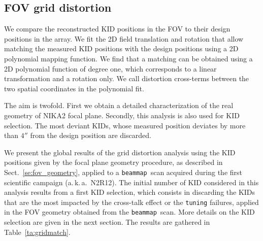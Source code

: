 \documentclass[traditionalabstract]{aa}
\newcommand{\aka}{a.\,k.\,a.}
\newcommand{\bm}{{\tt beammap}}
\newcommand{\lp}[1]{#1}
\begin{document}
\subsection{FOV grid distortion}
\label{se:grid_distortion}

We compare the reconstructed KID positions in the FOV to their design
positions in the array. We fit the 2D field translation and rotation that allow
matching the measured KID positions with the design positions using a 2D
polynomial mapping function. {\lp We find that a matching can be
obtained using a 2D polynomial function of degree one, which corresponds to a linear
transformation and a rotation only.} We call distortion cross-terms
between the two spatial coordinates in the polynomial fit.

The aim is twofold. First we obtain a detailed
characterization of the real geometry of NIKA2 focal plane. Secondly,
{\lp this analysis is also used for KID
selection}. The most deviant KIDs, whose measured position deviates
by more than $4''$ from the design position are discarded. 

We present the global results of the grid distortion
analysis using the KID positions given
by the focal plane geometry procedure, as described in
Sect.~\ref{se:fov_geometry}, applied to a \bm\ scan acquired
during the first scientific campaign (\aka\ N2R12). 
The initial
number of KID considered in this analysis results from
a first KID selection, which consists in discarding the KIDs that are the most
impacted by the cross-talk effect or the {\tt tuning} failures,
applied in the FOV geometry obtained from the \bm\ scan. More details
on the KID selection are given in the next section. %
The results are gathered in Table~\ref{ta:gridmatch}.
\end{document}
